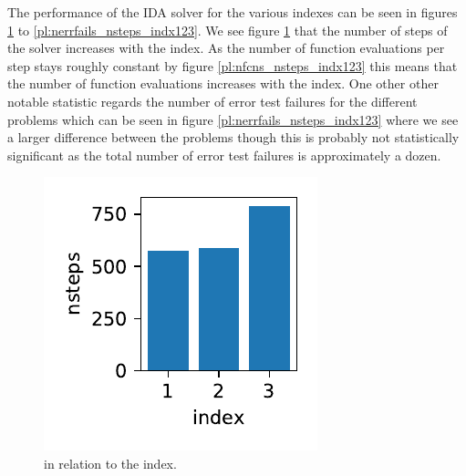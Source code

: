 \documentclass{report}
\newcounter{constant}
\begin{document}
The performance of the IDA solver for the various indexes can be seen in figures \ref{pl:nsteps_indx123} to \ref{pl:nerrfails_nsteps_indx123}. We see figure \ref{pl:nsteps_indx123} that the number of steps of the solver increases with the index. As the number of function evaluations per step stays roughly constant by figure \ref{pl:nfcns_nsteps_indx123} this means that the number of function evaluations increases with the index. One other other notable statistic regards the number of error test failures for the different problems which can be seen in figure \ref{pl:nerrfails_nsteps_indx123} where we see a larger difference between the problems though this is probably not statistically significant as the total number of error test failures is approximately a dozen.


\begin{figure}[h]
\centering
\begin{minipage}[t]{0.3\textwidth}
\centering
\includegraphics[width=\textwidth]{../Plots/Project2_main/Figure_600}
\caption{ in relation to the index.}
\label{pl:nsteps_indx123}
\end{minipage}
\hfill
\begin{minipage}[t]{0.3\textwidth}
\centering

\end{minipage}
\end{figure}
\end{document}
